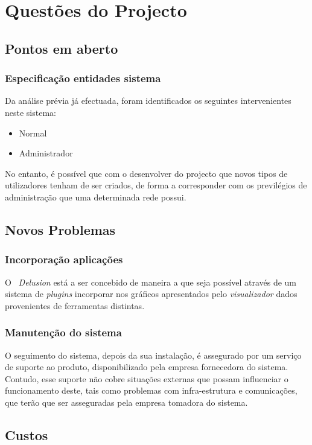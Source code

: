 \chapter{Questões do Projecto}
\minitoc
\section{Pontos em aberto}

\subsection{Especificação entidades sistema}
Da análise prévia já efectuada, foram identificados os seguintes intervenientes neste sistema:

\begin{itemize} 
\item Normal
\item Administrador
\end{itemize}

No entanto, é possível que com o desenvolver do projecto que novos tipos de utilizadores tenham de ser criados, de forma a corresponder com os previlégios de administração que uma determinada rede possui.
\section{Novos Problemas}

\subsection{Incorporação aplicações}

O ~\textit{Delusion} está a ser concebido de maneira a que seja possível através de um sistema de \emph{plugins} incorporar nos gráficos apresentados pelo \emph{visualizador} dados provenientes de ferramentas distintas.

\subsection{Manutenção do sistema}
O seguimento do sistema, depois da sua instalação, é assegurado por um serviço de suporte ao produto, disponibilizado pela empresa fornecedora do sistema. Contudo, esse suporte não cobre situações externas que possam influenciar o funcionamento deste, tais como problemas com infra-estrutura e comunicações, que terão que ser asseguradas pela empresa tomadora do sistema. 

\section{Custos}

